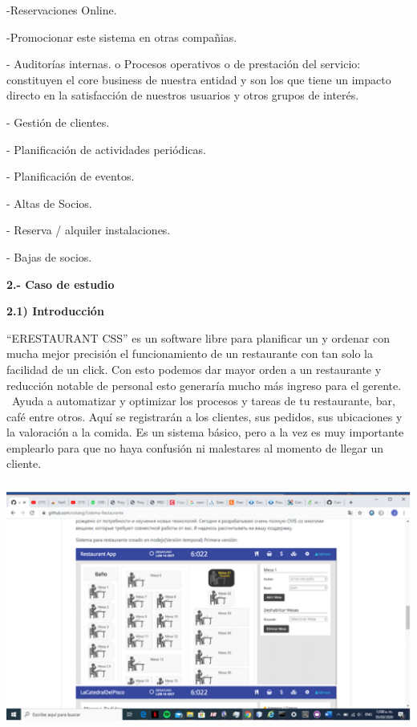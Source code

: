 \documentclass{article} %
\begin{document}
\noindent -Reservaciones Online. 

\noindent -Promocionar este sistema en otras compa\~{n}ias. 

\noindent - Auditor\'{i}as internas. o Procesos operativos o de prestaci\'{o}n del servicio: constituyen el core business de nuestra entidad y son los que tiene un impacto directo en la satisfacci\'{o}n de nuestros usuarios y otros grupos de inter\'{e}s.

\noindent  - Gesti\'{o}n de clientes. 

\noindent - Planificaci\'{o}n de actividades peri\'{o}dicas. 

\noindent - Planificaci\'{o}n de eventos. 

\noindent - Altas de Socios. 

\noindent - Reserva / alquiler instalaciones.

\noindent  - Bajas de socios.

\noindent \textbf{}

\noindent \textbf{}

\noindent \textbf{}

\noindent \textbf{}

\noindent \textbf{}

\noindent \textbf{}

\noindent \textbf{}

\noindent \textbf{}

\noindent \textbf{2.- Caso de estudio}

\noindent \textbf{     2.1) Introducci\'{o}n }

\noindent      ``ERESTAURANT CSS'' es un software libre para planificar un y ordenar con mucha mejor precisi\'{o}n el funcionamiento de un restaurante con tan solo la facilidad de un click. Con esto podemos dar mayor orden a un restaurante y reducci\'{o}n notable de personal esto generar\'{i}a mucho m\'{a}s ingreso para el gerente. ~Ayuda a automatizar y optimizar los procesos y tareas de tu restaurante, bar, caf\'{e} entre otros. Aqu\'{i} se registrar\'{a}n a los clientes, sus pedidos, sus ubicaciones y la valoraci\'{o}n a la comida. Es un sistema b\'{a}sico, pero a la vez es muy importante emplearlo para que no haya confusi\'{o}n ni malestares al momento de llegar un cliente.

\noindent \includegraphics*[width=5.54in, height=3.20in, keepaspectratio=false, trim=1.44in 0.41in 1.55in 1.19in]{image4} 
\end{document}
